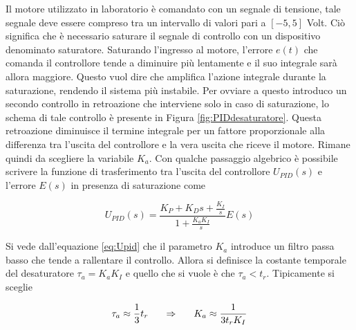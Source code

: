 		\noindent Il motore utilizzato in laboratorio è comandato con un segnale di tensione, tale segnale deve essere compreso tra un intervallo di valori pari a $[-5,5]$ Volt. Ciò significa che è necessario saturare il segnale di controllo con un dispositivo denominato saturatore. Saturando l'ingresso al motore, l'errore $e(t)$ che comanda il controllore tende a diminuire più lentamente e il suo integrale sarà allora maggiore. Questo vuol dire che amplifica l'azione integrale durante la saturazione, rendendo il sistema più instabile. Per ovviare a questo introduco un secondo controllo in retroazione che interviene solo in caso di saturazione, lo schema di tale controllo è presente in Figura \ref{fig:PIDdesaturatore}. Questa retroazione diminuisce il termine integrale per un fattore proporzionale alla differenza tra l'uscita del controllore e la vera uscita che riceve il motore. Rimane quindi da scegliere la variabile $K_a$. Con qualche passaggio algebrico è possibile scrivere la funzione di trasferimento tra l'uscita del controllore $U_{PID}(s)$ e l'errore $E(s)$ in presenza di saturazione come   
	
		\begin{equation}
			U_{PID}(s)=\frac{K_P+K_Ds+\frac{K_I}{s}}{1+\frac{K_aK_I}{s}}E(s)
			\label{eq:Upid}
		\end{equation}
	
		\noindent Si vede dall'equazione \ref{eq:Upid} che il parametro $K_a$ introduce un filtro passa basso che tende a rallentare il controllo. Allora si definisce la costante temporale del desaturatore $\tau_a=K_aK_I$ e quello che si vuole è che $\tau_a<t_r$. Tipicamente si sceglie
		
		\begin{equation}
			\tau_a \approx \frac{1}{3}t_r \trippleSpacing \Rightarrow \trippleSpacing K_a \approx \frac{1}{3t_rK_I}
		\end{equation}